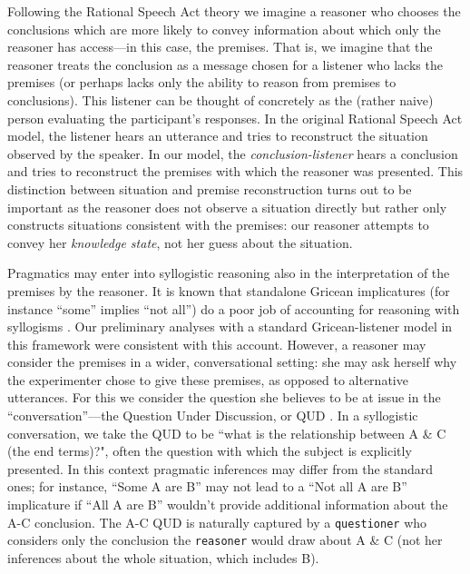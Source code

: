 \documentclass[10pt,letterpaper]{article}
\begin{document}
Following the Rational Speech Act theory \cite{Goodman2013,Frank2012a} we imagine a reasoner who chooses the conclusions which are more likely to convey information about which only the reasoner has access---in this case, the premises. That is, we imagine that the reasoner treats the conclusion as a message chosen for a listener who lacks the premises (or perhaps lacks only the ability to reason from premises to conclusions).
This listener can be thought of concretely as the (rather naive) person evaluating the participant's responses. In the original Rational Speech Act model, the listener hears an utterance and tries to reconstruct the situation observed by the speaker. In our model, the \emph{conclusion-listener} hears a conclusion and tries to reconstruct the premises with which the reasoner was presented. This distinction between situation and premise reconstruction turns out to be important as the reasoner does not observe a situation directly but rather only constructs situations consistent with the premises: our reasoner attempts to convey her \emph{knowledge state}, not her guess about the situation.

Pragmatics may enter into syllogistic reasoning also in the interpretation of the premises by the reasoner. It is known that standalone Gricean implicatures (for instance ``some'' implies ``not all'') do a poor job of accounting for reasoning with syllogisms \cite{Roberts2001}. Our preliminary analyses with a standard Gricean-listener model in this framework were consistent with this account. 
However, a reasoner may consider the premises in a wider, conversational setting: she may ask herself why the experimenter chose to give these premises, as opposed to alternative utterances. For this we consider the question she believes to be at issue in the ``conversation''---the Question Under Discussion, or QUD \cite{Roberts2004QUD}. In a syllogistic conversation, we take the QUD to be ``what is the relationship between A \& C (the end terms)?", often the question with which the subject is explicitly presented. In this context pragmatic inferences may differ from the standard ones; for instance, ``Some A are B'' may not lead to a ``Not all A are B'' implicature if ``All A are B'' wouldn't provide additional information about the A-C conclusion. The A-C QUD is naturally captured by a \lstinline{questioner} who considers only the conclusion the \lstinline{reasoner} would draw about A \& C (not her inferences about the whole situation, which includes B).

\end{document}
